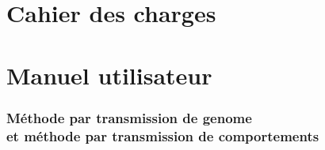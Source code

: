 \documentclass[a4paper, 12pt]{report}
\begin{document}
    \chapter{Cahier des charges}
    \begin{figure}[H]
		
    \end{figure}
    \chapter{Manuel utilisateur}
    
    
    \subsection{Méthode par transmission de genome \\ et méthode par transmission de comportements}
    
\end{document}
